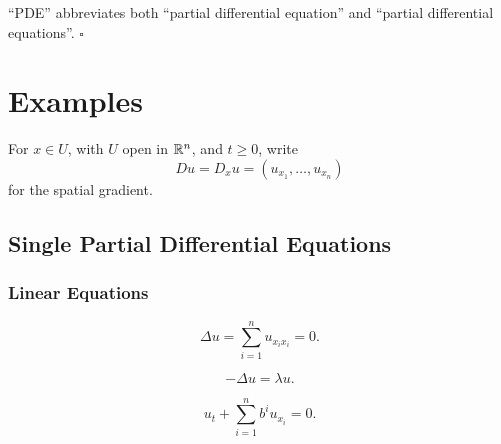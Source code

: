 \begin{remark}
\label{rem:pde-abbreviation}
``PDE'' abbreviates both ``partial differential equation'' and ``partial differential equations''. $\square$
\end{remark}
\section{Examples}
\label{sec:pde-examples}

For $x \in U$, with $U$ open in $\mathbb{R}^n$, and $t \geq 0$, write
$$Du = D_xu = (u_{x_1},\ldots,u_{x_n})$$
for the spatial gradient.

\subsection{Single Partial Differential Equations}
\label{sec:single-pdes}

\subsubsection{Linear Equations}
\label{sec:examples-linear-equations}

\begin{example}
\label{ex:laplaces-equation}





$$\Delta u = \sum_{i=1}^n u_{x_i x_i} = 0.$$
\end{example}

\begin{example}
\label{ex:helmholtz-eigenvalue-equation}





$$-\Delta u = \lambda u.$$
\end{example}

\begin{example}
\label{ex:linear-transport-equation}





$$u_t + \sum_{i=1}^n b^i u_{x_i} = 0.$$
\end{example}

